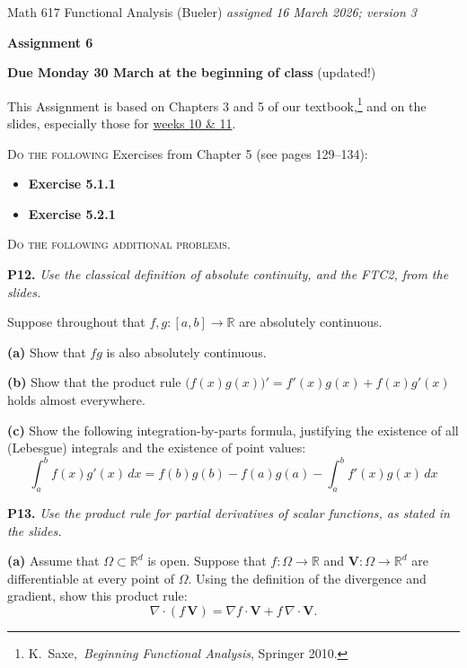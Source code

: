 \documentclass[12pt]{amsart}
\newcommand{\bV}{\mathbf{V}}
\newcommand{\RR}{\mathbb{R}}
\newcommand{\Div}{\nabla\cdot}
\newcommand{\grad}{\nabla}
\newcommand{\prob}[1]{\bigskip\noindent\textbf{#1.}\quad }
\newcommand{\epart}[1]{\medskip\noindent\textbf{(#1)}\quad }
\begin{document}
\scriptsize \noindent Math 617 Functional Analysis (Bueler) \hfill \emph{assigned 16 March 2026; {\color{red} version 3}}
\normalsize\medskip

\Large\centerline{\textbf{Assignment 6}}
\large
\medskip

\centerline{\textbf{Due Monday 30 March at the beginning of class} {\color{red} (updated!)}}
\medskip
\normalsize

\thispagestyle{empty}

\bigskip
\noindent This Assignment is based on Chapters 3 and 5 of our textbook,\footnote{K.~Saxe,~\emph{Beginning Functional Analysis}, Springer 2010.} and on the slides, especially those for \href{https://bueler.github.io/fa/assets/slides/S26/week10.pdf}{weeks 10 \& 11}.

\newcommand{\augment}[1]{\quad\,\strut \begin{minipage}[t]{0.7\textwidth} \emph{#1}\end{minipage}}

\newcommand{\augpart}[1]{\emph{\textbf{(#1)}}}

\bigskip
\noindent \textsc{Do the following} Exercises from Chapter 5 (see pages 129--134):

\begin{itemize}
\item \textbf{Exercise 5.1.1}
\item \textbf{Exercise 5.2.1}
\end{itemize}

\medskip
\noindent \textsc{Do the following additional problems.}

\prob{P12}  \emph{Use the classical definition of absolute continuity, and the FTC2, from the slides.}

\medskip \noindent Suppose throughout that $f,g:[a,b] \to \RR$ are absolutely continuous.

\epart{a} Show that $fg$ is also absolutely continuous.

\epart{b} Show that the product rule $\big(f(x) g(x)\big)' = f'(x) g(x) + f(x) g'(x)$ holds almost everywhere.

\epart{c} Show the following integration-by-parts formula, justifying the existence of all (Lebesgue) integrals and the existence of point values:
	$$\int_a^b f(x) g'(x)\,dx = f(b)g(b) - f(a)g(a) - \int_a^b f'(x) g(x)\,dx$$


\prob{P13}  \emph{Use the product rule for partial derivatives of scalar functions, as stated in the slides.}

\epart{a} Assume that $\Omega\subset \RR^d$ is open.  Suppose that $f:\Omega\to\RR$ and $\bV:\Omega\to \RR^d$ are differentiable at every point of $\Omega$.  Using the definition of the divergence and gradient, show this product rule:
    $$\Div (f\,\bV) = \grad f\cdot \bV + f\,\Div \bV.$$
\end{document}

